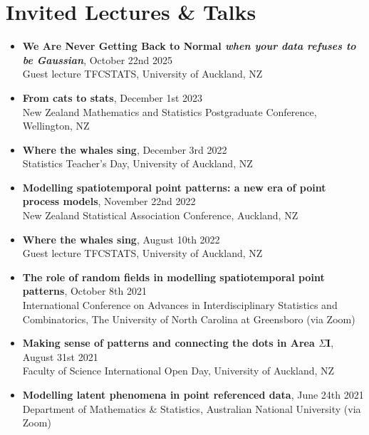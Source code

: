 \documentclass[10pt,a4paper]{moderncv}
\begin{document}
\section*{Invited Lectures \& Talks}

\begin{itemize}
\item \textbf{We Are Never Getting Back to Normal \textit{when your data refuses to be Gaussian}}, October 22nd 2025\\
  { Guest lecture TFCSTATS, University of Auckland, NZ}
  
    \item \textbf{From cats to stats}, December 1st 2023\\
    { New Zealand Mathematics and Statistics Postgraduate Conference, Wellington, NZ}
    
    \item \textbf{Where the whales sing}, December 3rd 2022\\
    { Statistics Teacher's Day, University of Auckland, NZ}
    
    \item \textbf{Modelling spatiotemporal point patterns: a new era of point process models}, November 22nd 2022\\
    { New Zealand Statistical Association Conference, Auckland, NZ}
    
    \item \textbf{Where the whales sing}, August 10th 2022\\
    { Guest lecture TFCSTATS, University of Auckland, NZ}
    
    \item \textbf{The role of random fields in modelling spatiotemporal point patterns}, October 8th 2021\\
    { International Conference on Advances in Interdisciplinary Statistics and Combinatorics, The University of North Carolina at Greensboro (via Zoom)}
    
    \item \textbf{Making sense of patterns and connecting the dots in Area $\Sigma$I}, August 31st 2021\\
    { Faculty of Science International Open Day, University of Auckland, NZ}
    
    \item \textbf{Modelling latent phenomena in point referenced data}, June 24th 2021\\
    { Department of Mathematics \& Statistics, Australian National University (via Zoom)}
    

\end{itemize}
\end{document}
